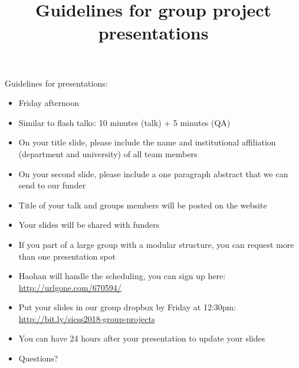 \documentclass[aspectratio=169]{beamer}
\title[]{Guidelines for group project presentations}
\author[]{}
\date[]{Summer Institute in Computational Social Science\\June 28, 2018
\vfill
\begin{flushleft}
{\scriptsize
The Summer Institute in Computational Social Science is supported by grants from the Russell Sage Foundation and the Alfred P. Sloan Foundation.}
\end{flushleft}
\begin{flushright}
\texttt{[image: figures/cc-by.png]}
\end{flushright}
}
\begin{document}
\frame{\titlepage}
\begin{frame}

Guidelines for presentations:
\begin{itemize}
\item Friday afternoon \pause
\item Similar to flash talks: 10 minutes (talk) + 5 minutes (QA) \pause
\item On your title slide, please include the name and institutional affiliation (department and university) of all team members \pause
\item On your second slide, please include a one paragraph abstract that we can send to our funder \pause
\item Title of your talk and groups members will be posted on the website \pause
\item Your slides will be shared with funders \pause
\item If you part of a large group with a modular structure, you can request more than one presentation spot \pause
\item Haohan will handle the scheduling, you can sign up here: \textcolor{blue}{\url{http://urlgone.com/670594/}} \pause
\item Put your slides in our group dropbox by Friday at 12:30pm: \textcolor{blue}{\url{http://bit.ly/sicss2018-group-projects}} \pause
\item You can have 24 hours after your presentation to update your slides \pause
\item Questions?
\end{itemize}

\end{frame}
\end{document}
